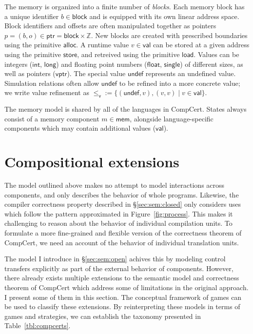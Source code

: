 \documentclass[11pt,oneside,draft]{book}
\theoremstyle{definition}
\newcommand{\kw}[1]{\ensuremath{ \mathsf{#1} }}
\newcommand{\vref}{\le_\kw{v}}   %
\begin{document}
The memory is organized into a finite number of \emph{blocks}.
Each memory block has a unique identifier $b \in \kw{block}$
and is equipped with its own linear address space.
Block identifiers and offsets are often manipulated together
as pointers $p = (b, o) \in \kw{ptr} = \kw{block} \times \mathbb{Z}$.
New blocks are created with prescribed boundaries
using the primitive $\kw{alloc}$.
A runtime value $v \in \kw{val}$ can be stored at
a given address using the primitive \kw{store},
and retreived using the primitive \kw{load}.
Values can be integers (\kw{int}, \kw{long}) and
floating point numbers (\kw{float}, \kw{single})
of different sizes,
as well as pointers (\kw{vptr}).
The special value \kw{undef}
represents an undefined value.
Simulation relations
often allow $\kw{undef}$
to be refined into a more concrete value;
we write value refinement as
${\vref} := \{(\kw{undef}, v), (v, v) \mid v \in \kw{val}\}$.

The memory model is shared by all of the languages in CompCert.
States always consist of
a memory component $m \in \kw{mem}$,
alongside language-specific components
which may contain additional values ($\kw{val}$).



\section{Compositional extensions} \label{sec:compcert-ext} %

The model outlined above
makes no attempt to model interactions across components,
and only
describes the behavior of whole programs.
Likewise,
the compiler correctness property
described in \S\ref{sec:sem:closed}
only considers uses which follow
the pattern approximated in Figure~\ref{fig:process}.
This makes it challenging to reason about
the behavior of individual compilation units.
To formulate a more fine-grained and flexible
version of the correctness theorem of CompCert,
we need an account of
the behavior of individual translation units.

The model I introduce in \S\ref{sec:sem:open}
achives this by modeling control transfers explicitly
as part of the external behavior of components.
However,
there already exists multiple extensions
to the semantic model
and correctness theorem of CompCert
which address some of limitations
in the original approach.
I present some of them in this section.
The conceptual framework of games
can be used to classify these extensions.
By reinterpreting these models
in terms of games and strategies,
we can establish the taxonomy presented in
Table~\ref{tbl:compcerts}.
\end{document}
